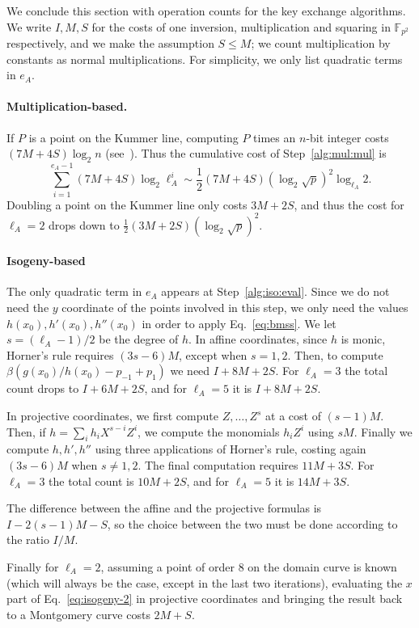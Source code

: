 \documentclass[envcountsect,envcountsame,runningheads]{llncs}   %
\newcommand{\FF}{{\mathbb{F}}}
\begin{document}
We conclude this section with operation counts for the key exchange
algorithms. We write $I,M,S$ for the costs of one inversion,
multiplication and squaring in $\FF_{p^2}$ respectively, and we make
the assumption $S\le M$; we count multiplication by constants as
normal multiplications. For simplicity, we only list quadratic terms
in $e_A$.

\paragraph{Multiplication-based.}
If $P$ is a point on the Kummer line, computing $P$ times an $n$-bit
integer costs $(7M+4S)\log_2n$ (see~\cite{montgomery}). Thus the
cumulative cost of Step~\ref{alg:mul:mul}
is \[\sum_{i=1}^{e_A-1}(7M+4S) \log_2\ell_A^{i} \sim
\frac{1}{2}(7M+4S) (\log_2\sqrt{p})^2\log_{\ell_A}2.\] Doubling a
point on the Kummer line only costs $3M+2S$, and thus the cost for
$\ell_A=2$ drops down to $\frac{1}{2}(3M+2S)(\log_2\sqrt{p})^2$.

\paragraph{Isogeny-based}
The only quadratic term in $e_A$ appears at
Step~\ref{alg:iso:eval}. Since we do not need the $y$ coordinate of
the points involved in this step, we only need the values $h(x_0),
h'(x_0), h''(x_0)$ in order to apply Eq.~\eqref{eq:bmss}. We let
$s=(\ell_A-1)/2$ be the degree of $h$. In affine coordinates, since
$h$ is monic, Horner's rule requires $(3s-6)M$, except when
$s=1,2$. Then, to compute $\beta(g(x_0)/h(x_0)-p_{-1}+p_1)$ we need
$I+8M+2S$. For $\ell_A=3$ the total count drops to $I+6M+2S$, and for
$\ell_A=5$ it is $I+8M+2S$. 

In projective coordinates, we first compute $Z,\ldots,Z^s$ at a cost of
$(s-1)M$. Then, if $h=\sum_ih_iX^{s-i}Z^i$, we compute the monomials
$h_iZ^i$ using $sM$. Finally we compute $h,h',h''$ using three applications
of Horner's rule, costing again $(3s-6)M$ when $s\ne1,2$. The final computation
requires $11M+3S$. For $\ell_A=3$ the total count is $10M+2S$, and for
$\ell_A=5$ it is $14M+3S$. 

The difference between the affine and the projective formulas is
$I-2(s-1)M-S$, so the choice between the two must be done according to
the ratio $I/M$.

Finally for $\ell_A=2$, assuming a point of order $8$ on the domain
curve is known (which will always be the
case, except in the last two iterations), evaluating the $x$ part of
Eq.~\ref{eq:isogeny-2} in projective coordinates and bringing
the result back to a Montgomery curve costs $2M+S$.
\end{document}
